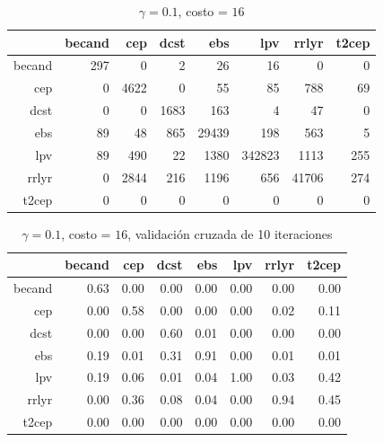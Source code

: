 \documentclass[letterpaper,12pt]{book}
\begin{document}
\begin{table}[ht]
  \centering
  \caption{$\gamma = 0.1$, costo = $16$} 
  \label{table:cmSvm}
  \begin{tabular}{rrrrrrrr}
    \hline
    & becand & cep & dcst & ebs & lpv & rrlyr & t2cep \\ 
    \hline
    becand & 297 &   0 &   2 &  26 &  16 &   0 &   0 \\ 
    cep &   0 & 4622 &   0 &  55 &  85 & 788 &  69 \\ 
    dcst &   0 &   0 & 1683 & 163 &   4 &  47 &   0 \\ 
    ebs &  89 &  48 & 865 & 29439 & 198 & 563 &   5 \\ 
    lpv &  89 & 490 &  22 & 1380 & 342823 & 1113 & 255 \\ 
    rrlyr &   0 & 2844 & 216 & 1196 & 656 & 41706 & 274 \\ 
    t2cep &   0 &   0 &   0 &   0 &   0 &   0 &   0 \\ 
    \hline
  \end{tabular}
\end{table}

\begin{table}[ht]
  \centering
  \caption{$\gamma = 0.1$, costo = $16$, validación cruzada de 10 iteraciones} 
  \label{table:cmCvSvm}
  \begin{tabular}{rrrrrrrr}
    \hline
    & becand & cep & dcst & ebs & lpv & rrlyr & t2cep \\ 
    \hline
    becand & 0.63 & 0.00 & 0.00 & 0.00 & 0.00 & 0.00 & 0.00 \\ 
    cep & 0.00 & 0.58 & 0.00 & 0.00 & 0.00 & 0.02 & 0.11 \\ 
    dcst & 0.00 & 0.00 & 0.60 & 0.01 & 0.00 & 0.00 & 0.00 \\ 
    ebs & 0.19 & 0.01 & 0.31 & 0.91 & 0.00 & 0.01 & 0.01 \\ 
    lpv & 0.19 & 0.06 & 0.01 & 0.04 & 1.00 & 0.03 & 0.42 \\ 
    rrlyr & 0.00 & 0.36 & 0.08 & 0.04 & 0.00 & 0.94 & 0.45 \\ 
    t2cep & 0.00 & 0.00 & 0.00 & 0.00 & 0.00 & 0.00 & 0.00 \\ 
    \hline
  \end{tabular}
\end{table}
\end{document}
